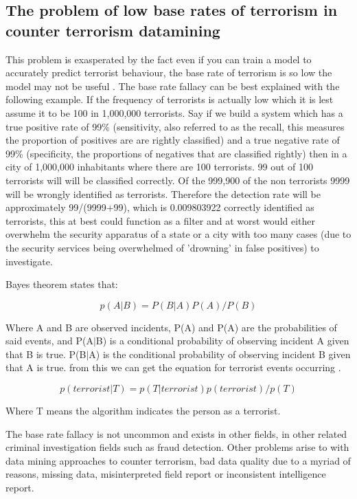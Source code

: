 \subsection{The problem of low base rates of terrorism in counter terrorism datamining}
This problem is exasperated by the fact even if you can train a model to accurately predict terrorist behaviour, the base rate of terrorism is so low the model may not be useful \citep{jensen2003information}. The base rate fallacy can be best explained with the following example. If the frequency of terrorists is actually low which it is lest assume it to be 100 in 1,000,000 terrorists. Say if we build a system which has a true positive rate of 99\% (sensitivity, also referred to as the recall, this measures the proportion of positives are are rightly classified) and a true negative rate of 99\% (specificity, the proportions of negatives that are classified rightly) then in a city of 1,000,000 inhabitants where there are 100 terrorists. 99 out of 100 terrorists will will be classified correctly. Of the 999,900 of the non terrorists 9999 will be wrongly identified as terrorists. Therefore the detection rate will be approximately 99/(9999+99), which is  0.009803922 correctly identified as terrorists, this at best could function as a filter and at worst would either overwhelm the security apparatus of a state or a city with too many cases (due to the security services being overwhelmed of 'drowning' in false positives) to investigate. 

Bayes theorem states that:

\begin{equation} p(A|B)=P(B|A)P(A)/P(B) \label{eq1bayes}  \end{equation}

Where A and B are observed incidents, P(A) and P(A) are the probabilities of said events, and P(A$\vert$B) is a conditional probability of observing incident A given that B is true. P(B$\vert$A) is the conditional probability of observing incident B given that A is true. from this we can get the equation for terrorist events occurring  \label{eq2bayes}.
 
\begin{equation} p(terrorist|T)=p(T|terrorist)p(terrorist)/p(T) \label{eq2bayes}  \end{equation}

Where T means the algorithm indicates the person as a terrorist.

The base rate fallacy is not uncommon and exists in other fields, in other related criminal investigation fields such as fraud detection. Other problems arise to with data mining approaches to counter terrorism, bad data quality due to a myriad of reasons, missing data, misinterpreted field report or inconsistent intelligence report. 

